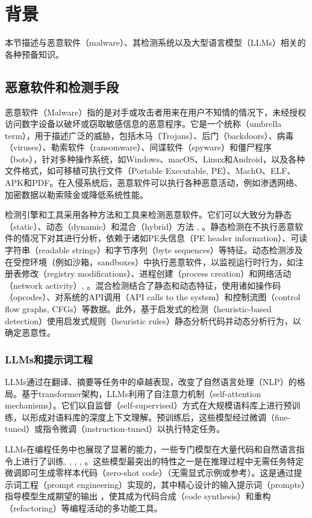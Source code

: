 
\chapter{背景}
本节描述与恶意软件（malware）、其检测系统以及大型语言模型（LLMs）相关的各种预备知识。

\section{恶意软件和检测手段}
恶意软件（Malware）指的是对手或攻击者用来在用户不知情的情况下，未经授权访问数字设备以破坏或窃取敏感信息的恶意程序\parencite{Chen2012}。它是一个统称（umbrella term），用于描述广泛的威胁，包括木马（Trojans）、后门（backdoors）、病毒（viruses）、勒索软件（ransomware）、间谍软件（spyware）和僵尸程序（bots）\parencite{Ye2017}，针对多种操作系统，如Windows、macOS、Linux和Android，以及各种文件格式，如可移植可执行文件（Portable Executable, PE）、MachO、ELF、APK和PDF\parencite{Ling2023}。在入侵系统后，恶意软件可以执行各种恶意活动，例如渗透网络、加密数据以勒索赎金或降低系统性能。

检测引擎和工具采用各种方法和工具来检测恶意软件。它们可以大致分为静态（static）、动态（dynamic）和混合（hybrid）方法 \parencite{Ling2023}, \parencite{Zhang2022}。静态检测在不执行恶意软件的情况下对其进行分析，依赖于诸如PE头信息（PE header information）、可读字符串（readable strings）和字节序列（byte sequences）等特征\parencite{Ling2023}。动态检测涉及在受控环境（例如沙箱，sandboxes）中执行恶意软件，以监视运行时行为，如注册表修改（registry modifications）、进程创建（process creation）和网络活动（network activity）\parencite{Ling2023}, \parencite{Zhang2022}。混合检测结合了静态和动态特征，使用诸如操作码（opcodes）、对系统的API调用（API calls to the system）和控制流图（control flow graphs, CFGs）等数据\parencite{Ling2023}。此外，基于启发式的检测（heuristic-based detection）使用启发式规则（heuristic rules）静态分析代码并动态分析行为，以确定恶意性\parencite{Geng2024}。

\subsection{LLMs和提示词工程}
LLMs通过在翻译、摘要等任务中的卓越表现，改变了自然语言处理（NLP）的格局。基于transformer架构\parencite{Vaswani2017}，LLMs利用了自注意力机制（self-attention mechanisms）。它们以自监督（self-supervised）方式在大规模语料库上进行预训练，以形成对语料库的深度上下文理解。预训练后，这些模型经过微调（fine-tuned）或指令微调（instruction-tuned）以执行特定任务。

LLMs在编程任务中也展现了显著的能力，一些专门模型在大量代码和自然语言指令上进行了训练\parencite{MAI2024}, \parencite{Roziere2023}, \parencite{Lozhkov2024}, \parencite{Huang2024}, \parencite{Guo2024}。这些模型最突出的特性之一是在推理过程中无需任务特定微调即可生成零样本代码（zero-shot code）（无需显式示例或参考）。这是通过提示词工程（prompt engineering）实现的，其中精心设计的输入提示词（prompts）指导模型生成期望的输出 \parencite{Brown2020}，使其成为代码合成（code synthesis）和重构（refactoring）等编程活动的多功能工具。
